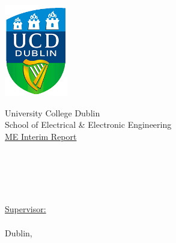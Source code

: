 
\begin{titlepage}
\centering
\includegraphics[height=4cm]{Figures/ucd_logo.png} \\
\begin{doublespacing}
\LARGE
University College Dublin \\
\Large
School of Electrical \& Electronic Engineering \\
\large
\underline{ME Interim Report}
\end{doublespacing}


\huge
\textbf{\doctitle \\}
\begin{singlespacing}
    \Large
    \authorone \\
    \sauthorone \\
\end{singlespacing}
\vfill
\large
\underline{Supervisor:} \\
\firstCommitteeMember \\



\large
Dublin, \monthYear \\


\end{titlepage} 
\clearpage
